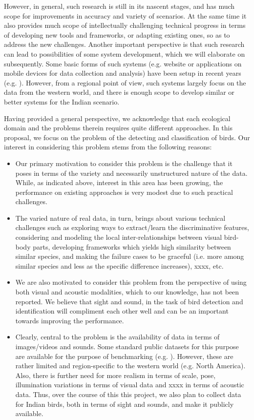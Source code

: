 \documentclass{article}
\begin{document}
However, in general, such research is still in its nascent stages, and has much scope for improvements in accuracy and variety of scenarios. At the same time it also provides much scope of intellectually challenging technical progress in terms of developing new tools and frameworks, or adapting existing ones, so as to address the new challenges. Another important perspective is that such research can lead to possibilities of some system development, which we will elaborate on subsequently. Some basic forms of such systems (e.g. website or applications on mobile devices for data collection and analysis) have been setup in recent years (e.g. \cite{birdsnap}). However, from a regional point of view, such systems largely focus on the data from the western world, and there is enough scope to develop similar or better systems for the Indian scenario. 

Having provided a general perspective, we acknowledge that each ecological domain and the problems therein requires quite different approaches. In this proposal, we focus on the problem of the detecting and classification of birds. Our interest in considering this problem stems from the following reasons: 
\begin{itemize}
\item Our primary motivation to consider this problem is the challenge that it poses in terms of the variety and necessarily unstructured nature of the data. While, as indicated above, interest in this area has been growing, the performance on existing approaches is very modest due to such practical challenges. 
\item The varied nature of real data, in turn, brings about various technical challenges such as exploring ways to extract/learn the discriminative features, considering and modeling the local inter-relationships between visual bird-body parts, developing frameworks which yields high similarity between similar species, and making the failure cases to be graceful (i.e. more among similar species and less as the specific difference increases), xxxx, etc. 
\item We are also motivated to consider this problem from the perspective of using both visual and acoustic modalities, which to our knowledge, has not been reported. We believe that sight and sound, in the task of bird detection and identification will compliment each other well and can be an important towards improving the performance. 
\item Clearly, central to the problem is the availability of data in terms of images/videos and sounds. Some standard public datasets for this purpose are available for the purpose of benchmarking (e.g. \cite{cub}). However, these are rather limited and region-specific to the western world (e.g. North America). Also, there is further need for more realism in terms of scale, pose, illumination variations in terms of visual data and xxxx in terms of acoustic data. Thus, over the course of this this project, we also plan to collect data for Indian birds, both in terms of sight and sounds, and make it publicly available.
\end{itemize}
 
\end{document}
